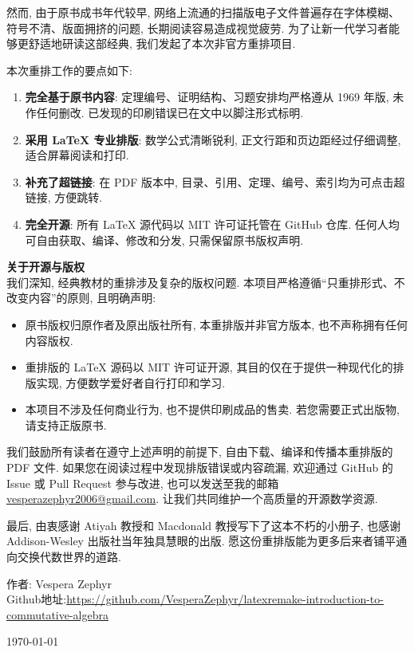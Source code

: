 \documentclass[11pt,b5paper,openright,twoside]{book}
\theoremstyle{plain}
\theoremstyle{definition}
\theoremstyle{remark}
\begin{document}
然而, 由于原书成书年代较早, 网络上流通的扫描版电子文件普遍存在字体模糊、符号不清、版面拥挤的问题, 长期阅读容易造成视觉疲劳. 为了让新一代学习者能够更舒适地研读这部经典, 我们发起了本次非官方重排项目. 

本次重排工作的要点如下: 
\begin{enumerate}
  \item \textbf{完全基于原书内容}: 定理编号、证明结构、习题安排均严格遵从 1969 年版, 未作任何删改. 已发现的印刷错误已在文中以脚注形式标明. 
  \item \textbf{采用 \LaTeX{} 专业排版}: 数学公式清晰锐利, 正文行距和页边距经过仔细调整, 适合屏幕阅读和打印. 
  \item \textbf{补充了超链接}: 在 PDF 版本中, 目录、引用、定理、编号、索引均为可点击超链接, 方便跳转. 
  \item \textbf{完全开源}: 所有 \LaTeX{} 源代码以 MIT 许可证托管在 GitHub 仓库. 任何人均可自由获取、编译、修改和分发, 只需保留原书版权声明. 
\end{enumerate}

\noindent\textbf{关于开源与版权}\\
我们深知, 经典教材的重排涉及复杂的版权问题. 本项目严格遵循“只重排形式、不改变内容”的原则, 且明确声明: 
\begin{itemize}
  \item 原书版权归原作者及原出版社所有, 本重排版并非官方版本, 也不声称拥有任何内容版权. 
  \item 重排版的 \LaTeX{} 源码以 MIT 许可证开源, 其目的仅在于提供一种现代化的排版实现, 方便数学爱好者自行打印和学习. 
  \item 本项目不涉及任何商业行为, 也不提供印刷成品的售卖. 若您需要正式出版物, 请支持正版原书. 
\end{itemize}

我们鼓励所有读者在遵守上述声明的前提下, 自由下载、编译和传播本重排版的 PDF 文件. 如果您在阅读过程中发现排版错误或内容疏漏, 欢迎通过 GitHub 的 Issue 或 Pull Request 参与改进, 也可以发送至我的邮箱 \href{vesperazephyr2006@gmail.com}{vesperazephyr2006@gmail.com}. 让我们共同维护一个高质量的开源数学资源. 

最后, 由衷感谢 Atiyah 教授和 Macdonald 教授写下了这本不朽的小册子, 也感谢 Addison-Wesley 出版社当年独具慧眼的出版. 愿这份重排版能为更多后来者铺平通向交换代数世界的道路. 

\vspace{1.5cm}
\begin{flushright}
  作者: Vespera Zephyr\\
  Github地址:\url{https://github.com/VesperaZephyr/latexremake-introduction-to-commutative-algebra}

  \today
\end{flushright}
\tableofcontents

\mainmatter
\pagestyle{fancy}













\backmatter
\cleardoublepage
{}
{}
\printindex
\end{document}
